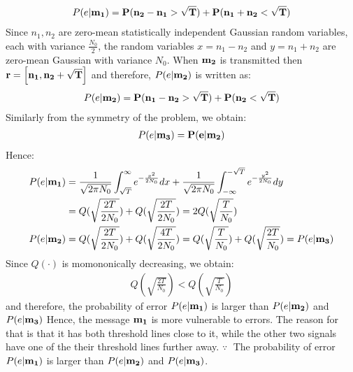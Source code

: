 \documentclass[a4paper,12pt]{article}
\begin{document}
\begin{enumerate}
\begin{align*}
                P(e | \bf{m_1}) = P(n_2 - n_1 > \sqrt{T}) + P(n_1 + n_2 < \sqrt{T})
            \end{align*}
            Since $n_1, n_2$ are zero-mean statistically independent Gaussian random variables, each with variance $\frac{N_0}{2}$, the random variables $x = n_1 - n_2$ and $y = n_1 + n_2$ are zero-mean Gaussian with variance $N_0$. 
            When $\bf{m_2}$ is transmitted then $\bf{r} = \left[n_1, n_2 + \sqrt{T}  \right]$ and therefore, $P(e | \bf{m_2})$ is written as:
            \begin{align*}
                P(e | \bf{m_2}) = P(n_1 - n_2 > \sqrt{T}) + P(n_2 < \sqrt{T})
            \end{align*}
            Similarly from the symmetry of the problem, we obtain:
            \begin{align*}
                P(e | \bf{m_3}) = P(e | \bf{m_2})
            \end{align*}
            Hence:
            \begin{align*}
                 P(e|\bf{m_1}) &= \frac{1}{\sqrt{2\pi N_0}} \int_{\sqrt{T}}^{\infty} e^{-\frac{x^2}{2N_0}} dx + \frac{1}{\sqrt{2\pi N_0}} \int_{-\infty}^{-\sqrt{T}} e^{-\frac{y^2}{2N_0}} dy \\ 
                          &= Q(\sqrt{\frac{2T}{2N_0}}) + Q(\sqrt{\frac{2T}{2N_0}}) = 2Q(\sqrt{\frac{T}{N_0}}) \\
                 P(e|\bf{m_2}) &= Q(\sqrt{\frac{2T}{2N_0}}) + Q(\sqrt{\frac{4T}{2N_0}}) = Q(\sqrt{\frac{T}{N_0}}) + Q(\sqrt{\frac{2T}{N_0}}) = P(e|\bf{m_3})
            \end{align*}
             Since $Q( \cdot )$  is momononically decreasing, we obtain: 
            \begin{align*}
                Q(\sqrt{\frac{2T}{N_0}}) < Q(\sqrt{\frac{T}{N_0}})
            \end{align*}
            and therefore, the probability of error $P(e|\bf{m_1})$ is larger than $P(e|\bf{m_2})$ and $P(e|\bf{m_3})$ Hence, the message $\bf{m_1}$ is more vulnerable to errors. The reason for that is that it has both threshold lines close to it, while the other two signals have one of the their threshold lines further away. 
            \newpage
            $\because \;$ The probability of error $P(e|\bf{m_1})$ is larger than $P(e|\bf{m_2})$ and $P(e|\bf{m_3})$. \\

\end{enumerate}
\end{document}
